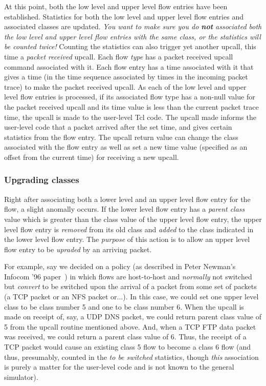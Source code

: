 \documentclass{article}
\begin{document}
At this point, both the low level and upper level flow entries have
been established.  Statistics for both the low level and upper level
flow entries and associated classes are updated.  \emph{You want to
make sure you do \textbf{not} associated both the low level and upper
level flow entries with the same class, or the statistics will be
counted twice!}  Counting the statistics can also trigger yet another
upcall, this time a \emph{packet received} upcall.  Each flow
\emph{type} has a packet received upcall command associated with it.
Each flow entry has a time associated with it that gives a time (in the
time sequence associated by times in the incoming packet trace) to make
the packet received upcall.  As each of the low level and upper level
flow entries is processed, if its associated flow type has a non-null
value for the packet received upcall and its time value is less than
the current packet trace time, the upcall is made to the user-level Tcl
code.  The upcall made informs the user-level code that a packet
arrived after the set time, and gives certain statistics from the flow
entry.  The upcall return value can change the class associated with
the flow entry as well as set a new time value (specified as an offset
from the current time) for receiving a new upcall.

\subsubsection{Upgrading classes}

Right after associating both a lower level and an upper level flow
entry for the flow, a slight anomally occurs.  If the lower level flow
entry has a \emph{parent class} value which is greater than the class
value of the upper level flow entry, the upper level flow entry is
\emph{removed} from its old class and \emph{added} to the class
indicated in the lower level flow entry.  The \emph{purpose} of this
action is to allow an upper level flow entry to be \emph{upraded} by an
arriving packet.

For example, say we decided on a policy (as described
in Peter Newman's Infocom '96 paper~\cite{xxx}) in which flows are
host-to-host and \emph{normally} not switched but \emph{convert} to be
switched upon the arrival of a packet from some set of packets (a TCP
packet or an NFS packet or...).  In this case, we could set one upper
level class to be class number 5 and one to be class number 6.  When
the upcall is made on receipt of, say, a UDP DNS packet, we could
return parent class value of 5 from the upcall routine mentioned above.
And, when a TCP FTP data packet was received, we could return a parent
class value of 6.  Thus, the receipt of a TCP packet would cause an
existing class 5 flow to become a class 6 flow (and thus, presumably,
counted in the \emph{to be switched} statistics, though \emph{this}
association is purely a matter for the user-level code and is not known
to the general simulator).
\end{document}
